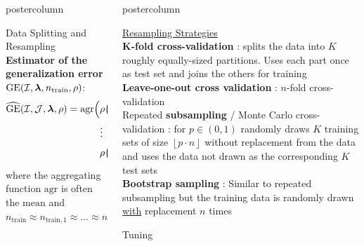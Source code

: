 \documentclass{beamer}
\newlength{\columnheight} %
\begin{document}
\begin{frame}[fragile]{}
\begin{columns}
\begin{column}{.31\textwidth}
\begin{beamercolorbox}[center]{postercolumn}
\begin{minipage}{.98\textwidth}
{\begin{myblock}{Data Splitting and Resampling}
\textbf{Estimator of the generalization error} $\mathrm{GE}(\mathcal{I}, \bm{\lambda}, n_\mathrm{train}, \rho)$:
\begin{equation*}
\begin{split}
\widehat{\mathrm{GE}}(\mathcal{I}, \mathcal{J}, \boldsymbol\lambda, \rho) = \mathrm{agr}\Big(
 &\rho\Big(\boldsymbol{y}_{J_{\mathrm{test},1}}, \boldsymbol{F}_{J_{\mathrm{test},1},\mathcal{I}(\mathcal{D}_{\mathrm{train},1}, \bm{\lambda})}\Big), \\ &\large{\vdots} \\
& \rho\Big(\boldsymbol{y}_{J_{\mathrm{test},B}}, \boldsymbol{F}_{J_{\mathrm{test},B},
\mathcal{I}(\mathcal{D}_{\mathrm{train},B}, \bm{\lambda})}\Big)
    \Big),
\end{split}
\end{equation*}
where the aggregating function $\mathrm{agr}$ is often the $\textrm{mean}$ and
$n_{\mathrm{train}} \approx n_{\mathrm{train},1} \approx \dots \approx n_{\mathrm{train},B}$ 
\end{myblock}
\vfill
				}
			\end{minipage}
		\end{beamercolorbox}
	\end{column}
	\begin{column}{.31\textwidth}
		\begin{beamercolorbox}[center]{postercolumn}
			\begin{minipage}{.98\textwidth}
				\parbox[t][\columnheight]{\textwidth}{
\underline{Resampling Strategies}\\

\textbf{K-fold cross-validation} : splits the data into $K$ roughly equally-sized partitions.
Uses each part once as test set and joins the others for training\\ 

\textbf{Leave-one-out cross validation}  : $n$-fold cross-validation\\

Repeated \textbf{subsampling} / Monte Carlo cross-validation : for $p \in (0,1)$ randomly draws $K$ training sets of size $\left \lfloor{p\cdot n}\right \rfloor $ without replacement from the data and uses the data not drawn as the corresponding $K$ test sets\\ 

\textbf{Bootstrap sampling} : Similar to repeated subsampling but the training data is randomly drawn \underline{with} replacement $n$ times\\ 
\begin{myblock}{Tuning}


\end{myblock}}
\end{minipage}
\end{beamercolorbox}
\end{column}
\end{columns}
\end{frame}
\end{document}

